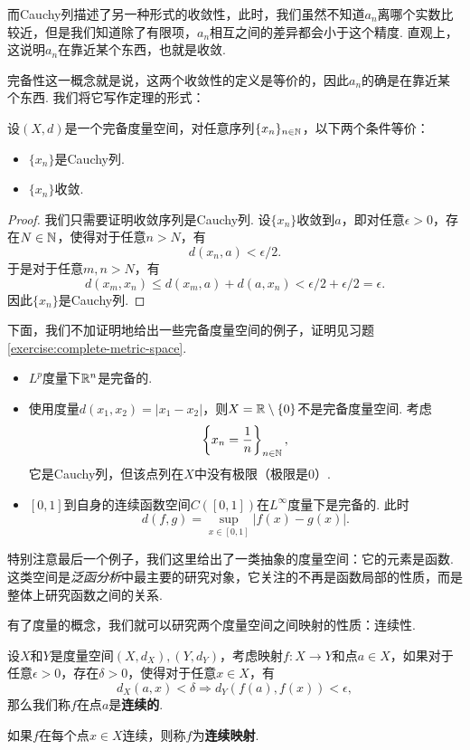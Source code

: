 而Cauchy列描述了另一种形式的收敛性，此时，我们虽然不知道$a_n$离哪个实数比较近，但是我们知道除了有限项，$a_n$相互之间的差异都会小于这个精度. 直观上，这说明$a_n$在靠近某个东西，也就是收敛. 

完备性这一概念就是说，这两个收敛性的定义是等价的，因此$a_n$的确是在靠近某个东西. 我们将它写作定理的形式：

\begin{theorem}\label{theorem:complete-metric-space-convergence}
    设$(X,d)$是一个完备度量空间，对任意序列$\{x_n\}_{n\in\mathbb{N}}$，以下两个条件等价：
    \begin{itemize}
        \item $\{x_n\}$是Cauchy列.
        \item $\{x_n\}$收敛.
    \end{itemize}
\end{theorem}
\begin{proof}
    我们只需要证明收敛序列是Cauchy列. 设$\{x_n\}$收敛到$a$，即对任意$\epsilon>0$，存在$N\in\mathbb{N}$，使得对于任意$n>N$，有
    \[d(x_n,a)<\epsilon/2.\]
    于是对于任意$m,n>N$，有
    \[d(x_m,x_n)\leq d(x_m,a)+d(a,x_n)<\epsilon/2+\epsilon/2=\epsilon.\]
    因此$\{x_n\}$是Cauchy列.
\end{proof}

下面，我们不加证明地给出一些完备度量空间的例子，证明见习题 \ref{exercise:complete-metric-space}.
\begin{example}\label{example:complete-metric-space}
\begin{itemize}
\item $L^p$度量下$\mathbb{R}^n$是完备的.
\item 使用度量$d(x_1,x_2)=|x_1-x_2|$，则$X=\mathbb{R}\setminus\{0\}$不是完备度量空间. 考虑
\[\left\{x_n=\frac1n\right\}_{n\in\mathbb{N}},\]
它是Cauchy列，但该点列在$X$中没有极限（极限是$0$）.

\item $[0,1]$到自身的连续函数空间$C([0,1])$在$L^\infty$度量下是完备的.
此时
\[d(f,g)=\sup_{x\in[0,1]}|f(x)-g(x)|.\]
\end{itemize}
\end{example}

特别注意最后一个例子，我们这里给出了一类抽象的度量空间：它的元素是函数. 这类空间是\textit{泛函分析}中最主要的研究对象，它关注的不再是函数局部的性质，而是整体上研究函数之间的关系.

有了度量的概念，我们就可以研究两个度量空间之间映射的性质：连续性. 

\begin{definition}[连续映射]
设$X$和$Y$是度量空间$(X,d_X),(Y,d_Y)$，考虑映射$f:X\to Y$和点$a\in X$，如果对于任意$\epsilon>0$，存在$\delta>0$，使得对于任意$x\in X$，有
    \[d_X(a,x) < \delta\Rightarrow d_Y(f(a),f(x))<\epsilon,\]
那么我们称$f$在点$a$是\textbf{连续的}.

如果$f$在每个点$x\in X$连续，则称$f$为\textbf{连续映射}.  
\end{definition}

